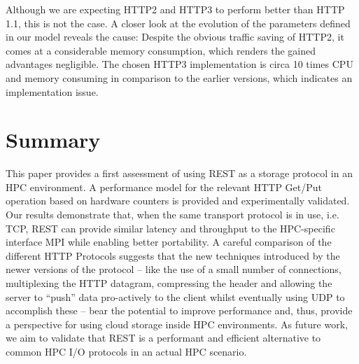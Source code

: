 \documentclass[runningheads]{llncs}
\begin{document}
Although we are expecting HTTP2 and HTTP3 to perform better than HTTP 1.1, this is not the case. A closer look at the evolution of the parameters defined in our model reveals the cause:
Despite the obvious traffic saving of HTTP2, it comes at a considerable memory consumption, which renders the gained advantages negligible. The chosen HTTP3 implementation is circa 10 times CPU and memory consuming in comparison to the earlier versions, which indicates an implementation issue.
\section{Summary}
This paper provides a first assessment of using REST as a storage protocol in an HPC environment. A performance model for the relevant HTTP Get/Put operation based on hardware counters is provided and experimentally validated. Our results demonstrate that, when the same transport protocol is in use, i.e. TCP, REST can provide similar latency and throughput to the HPC-specific interface MPI while enabling better portability.
A careful comparison of the different HTTP Protocols suggests that the new techniques introduced by the newer versions of the protocol -- like the use of a small number of connections, multiplexing the HTTP datagram, compressing the header and allowing the server to “push” data pro-actively to the client whilst eventually using UDP to accomplish these -- bear the potential to improve performance and, thus, provide a perspective for using cloud storage inside HPC environments.
As future work, we aim to validate that REST is a performant and efficient alternative to common HPC I/O protocols in an actual HPC scenario.

\nocite{*}
%
%
%





\end{document}
